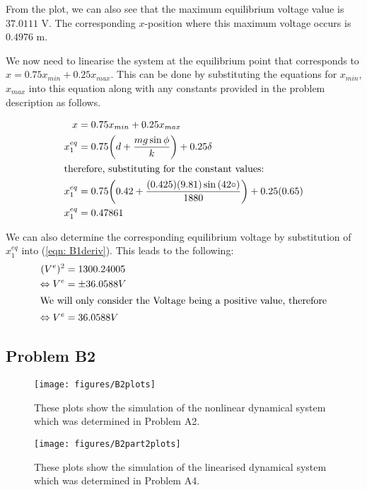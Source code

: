 \documentclass[a4paper,10pt,reqno]{amsart}
\numberwithin{equation}{section}
\begin{document}
From the plot, we can also see that the maximum equilibrium voltage value is $37.0111$ V. The corresponding $x$-position where this maximum voltage occurs is $0.4976$ m.


We now need to linearise the system at the equilibrium point that corresponds to $x=0.75x_{min}+0.25x_{max}$.
This can be done by substituting the equations for $x_{min}$, $x_{max}$ into this equation along with any constants provided in the problem description as follows.

\begin{align}
x &= 0.75x_{min} + 0.25 x_{max}\nonumber \\
x_1^{eq} &= 0.75 \bigg(d + \frac{mg \sin{\phi}}{k}\bigg) + 0.25 \delta \nonumber \\
\intertext{therefore, substituting for the constant values:}
x_1^{eq} &= 0.75 \bigg(0.42 + \frac{(0.425)(9.81) \sin{(42 \circ)}}{1880}\bigg) + 0.25(0.65) \nonumber \\
x_1^{eq} &= 0.47861 \label{eqn: xvalue}
\end{align}

We can also determine the corresponding equilibrium voltage by substitution of $x_1^{eq}$ into (\ref{eqn: B1deriv}).
This leads to the following:
\begin{align}
(V^e)^2 &= 1300.24005 \nonumber \\
\Leftrightarrow V^e &= \pm 36.0588 V \nonumber \\
\intertext{We will only consider the Voltage being a positive value, therefore}
\Leftrightarrow V^e &= 36.0588 V \label{eqn: Ve value}
\end{align}



\subsection{Problem B2}\label{sec:b2}

\begin{figure}[h]
\centering
\texttt{[image: figures/B2plots]}
\caption{These plots show the simulation of the nonlinear dynamical system which was determined in Problem A2.}
\label{fig:B2plots}
\end{figure}

\begin{figure}[h]
\centering
\texttt{[image: figures/B2part2plots]}
\caption{These plots show the simulation of the linearised dynamical system which was determined in Problem A4.}
\label{fig:B2part2plots}
\end{figure}
\end{document}
